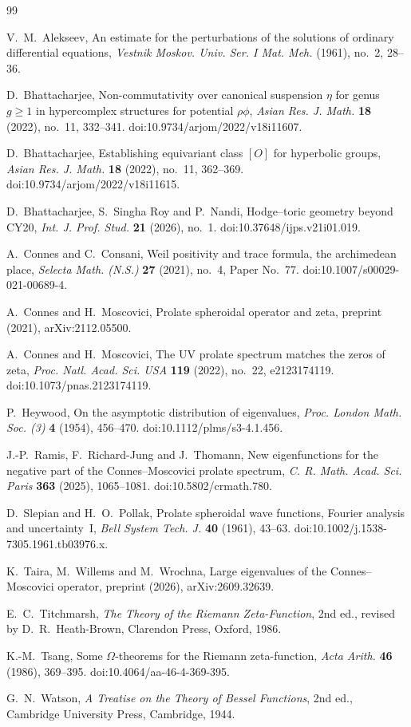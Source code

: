 \documentclass[11pt]{amsart}
\theoremstyle{definition}
\begin{document}
\begin{thebibliography}{99}

 V.~M.~Alekseev, An estimate for the perturbations of the solutions of ordinary differential equations, \emph{Vestnik Moskov. Univ. Ser. I Mat. Meh.} (1961), no.~2, 28--36.

 D.~Bhattacharjee, Non-commutativity over canonical suspension $\eta$ for genus $g\ge1$ in hypercomplex structures for potential $\rho\phi$, \emph{Asian Res. J. Math.} \textbf{18} (2022), no.~11, 332--341. doi:10.9734/arjom/2022/v18i11607.

 D.~Bhattacharjee, Establishing equivariant class $[O]$ for hyperbolic groups, \emph{Asian Res. J. Math.} \textbf{18} (2022), no.~11, 362--369. doi:10.9734/arjom/2022/v18i11615.

 D.~Bhattacharjee, S.~Singha Roy and P.~Nandi, Hodge--toric geometry beyond CY20, \emph{Int. J. Prof. Stud.} \textbf{21} (2026), no.~1. doi:10.37648/ijps.v21i01.019.

 A.~Connes and C.~Consani, Weil positivity and trace formula, the archimedean place, \emph{Selecta Math. (N.S.)} \textbf{27} (2021), no.~4, Paper No.~77. doi:10.1007/s00029-021-00689-4.

 A.~Connes and H.~Moscovici, Prolate spheroidal operator and zeta, preprint (2021), arXiv:2112.05500.

 A.~Connes and H.~Moscovici, The UV prolate spectrum matches the zeros of zeta, \emph{Proc. Natl. Acad. Sci. USA} \textbf{119} (2022), no.~22, e2123174119. doi:10.1073/pnas.2123174119.

 P.~Heywood, On the asymptotic distribution of eigenvalues, \emph{Proc. London Math. Soc. (3)} \textbf{4} (1954), 456--470. doi:10.1112/plms/s3-4.1.456.

 J.-P.~Ramis, F.~Richard-Jung and J.~Thomann, New eigenfunctions for the negative part of the Connes--Moscovici prolate spectrum, \emph{C. R. Math. Acad. Sci. Paris} \textbf{363} (2025), 1065--1081. doi:10.5802/crmath.780.

 D.~Slepian and H.~O.~Pollak, Prolate spheroidal wave functions, Fourier analysis and uncertainty~I, \emph{Bell System Tech. J.} \textbf{40} (1961), 43--63. doi:10.1002/j.1538-7305.1961.tb03976.x.

 K.~Taira, M.~Willems and M.~Wrochna, Large eigenvalues of the Connes--Moscovici operator, preprint (2026), arXiv:2609.32639.

 E.~C.~Titchmarsh, \emph{The Theory of the Riemann Zeta-Function}, 2nd ed., revised by D.~R.~Heath-Brown, Clarendon Press, Oxford, 1986.

 K.-M.~Tsang, Some $\Omega$-theorems for the Riemann zeta-function, \emph{Acta Arith.} \textbf{46} (1986), 369--395. doi:10.4064/aa-46-4-369-395.

 G.~N.~Watson, \emph{A Treatise on the Theory of Bessel Functions}, 2nd ed., Cambridge University Press, Cambridge, 1944.

\end{thebibliography}
\end{document}
